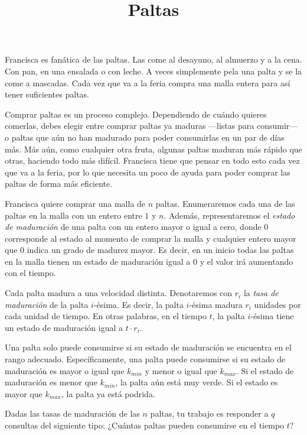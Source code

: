 \documentclass{oci}
\title{Paltas}
\begin{document}
\begin{problemDescription}
Francisca es fanática de las paltas.
Las come al desayuno, al almuerzo y a la cena.
Con pan, en una ensalada o con leche.
A veces simplemente pela una palta y se la come a mascadas.
Cada vez que va a la feria compra una malla entera para así tener suficientes paltas.

Comprar paltas es un proceso complejo.
Dependiendo de cuándo quieres comerlas, debes elegir entre comprar paltas ya maduras
—listas para consumir— o paltas que aún no han madurado para poder consumirlas
en un par de días más.
Más aún, como cualquier otra fruta, algunas paltas maduran más rápido que otras, haciendo
todo más difícil.
Francisca tiene que pensar en todo esto cada vez que va a la feria, por lo que necesita un poco de ayuda
para poder comprar las paltas de forma más eficiente.

Francisca quiere comprar una malla de $n$ paltas.
Enumeraremos cada una de las paltas en la malla con un entero entre $1$ y $n$.
Además, representaremos el \emph{estado de maduración} de una palta con un entero mayor o igual a cero,
donde 0 corresponde al estado al momento de comprar la malla y cualquier entero mayor que 0
indica un grado de madurez mayor.
Es decir, en un inicio todas las paltas en la malla tienen un estado de maduración igual a 0 y
el valor irá aumentando con el tiempo.

Cada palta madura a una velocidad distinta.
Denotaremos con $r_i$ la \emph{tasa de maduración} de la palta $i$-ésima.
Es decir, la palta $i$-ésima madura $r_i$ unidades por cada unidad de tiempo.
En otras palabras, en el tiempo $t$, la palta $i$-ésima tiene un estado de maduración
igual a $t \cdot r_i$.

Una palta solo puede consumirse si su estado de maduración se encuentra en el rango adecuado.
Específicamente, una palta puede consumirse si su estado de maduración es mayor o igual que
$k_{min}$ y menor o igual que $k_{max}$.
Si el estado de maduración es menor que $k_{min}$, la palta aún está muy verde.
Si el estado es mayor que $k_{max}$, la palta ya está podrida.

Dadas las tasas de maduración de las $n$ paltas, tu trabajo es responder a $q$ consultas
del siguiente tipo:
¿Cuántas paltas pueden consumirse en el tiempo $t$?
\end{problemDescription}
\end{document}
